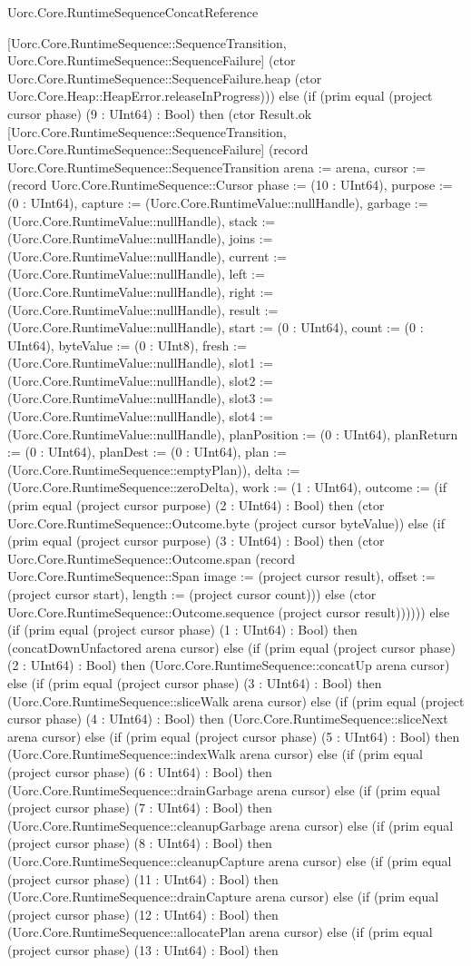 \begin{lexlean}{Uorc.Core.RuntimeSequenceConcatReference}
\begin{semanticmodule}
{[Uorc.Core.RuntimeSequence::SequenceTransition, Uorc.Core.RuntimeSequence::SequenceFailure] (ctor Uorc.Core.RuntimeSequence::SequenceFailure.heap (ctor Uorc.Core.Heap::HeapError.releaseInProgress))) else (if (prim equal (project cursor phase) (9 : UInt64) : Bool) then (ctor Result.ok [Uorc.Core.RuntimeSequence::SequenceTransition, Uorc.Core.RuntimeSequence::SequenceFailure] (record Uorc.Core.RuntimeSequence::SequenceTransition {arena := arena, cursor := (record Uorc.Core.RuntimeSequence::Cursor {phase := (10 : UInt64), purpose := (0 : UInt64), capture := (Uorc.Core.RuntimeValue::nullHandle), garbage := (Uorc.Core.RuntimeValue::nullHandle), stack := (Uorc.Core.RuntimeValue::nullHandle), joins := (Uorc.Core.RuntimeValue::nullHandle), current := (Uorc.Core.RuntimeValue::nullHandle), left := (Uorc.Core.RuntimeValue::nullHandle), right := (Uorc.Core.RuntimeValue::nullHandle), result := (Uorc.Core.RuntimeValue::nullHandle), start := (0 : UInt64), count := (0 : UInt64), byteValue := (0 : UInt8), fresh := (Uorc.Core.RuntimeValue::nullHandle), slot1 := (Uorc.Core.RuntimeValue::nullHandle), slot2 := (Uorc.Core.RuntimeValue::nullHandle), slot3 := (Uorc.Core.RuntimeValue::nullHandle), slot4 := (Uorc.Core.RuntimeValue::nullHandle), planPosition := (0 : UInt64), planReturn := (0 : UInt64), planDest := (0 : UInt64), plan := (Uorc.Core.RuntimeSequence::emptyPlan)}), delta := (Uorc.Core.RuntimeSequence::zeroDelta), work := (1 : UInt64), outcome := (if (prim equal (project cursor purpose) (2 : UInt64) : Bool) then (ctor Uorc.Core.RuntimeSequence::Outcome.byte (project cursor byteValue)) else (if (prim equal (project cursor purpose) (3 : UInt64) : Bool) then (ctor Uorc.Core.RuntimeSequence::Outcome.span (record Uorc.Core.RuntimeSequence::Span {image := (project cursor result), offset := (project cursor start), length := (project cursor count)})) else (ctor Uorc.Core.RuntimeSequence::Outcome.sequence (project cursor result))))})) else (if (prim equal (project cursor phase) (1 : UInt64) : Bool) then (concatDownUnfactored arena cursor) else (if (prim equal (project cursor phase) (2 : UInt64) : Bool) then (Uorc.Core.RuntimeSequence::concatUp arena cursor) else (if (prim equal (project cursor phase) (3 : UInt64) : Bool) then (Uorc.Core.RuntimeSequence::sliceWalk arena cursor) else (if (prim equal (project cursor phase) (4 : UInt64) : Bool) then (Uorc.Core.RuntimeSequence::sliceNext arena cursor) else (if (prim equal (project cursor phase) (5 : UInt64) : Bool) then (Uorc.Core.RuntimeSequence::indexWalk arena cursor) else (if (prim equal (project cursor phase) (6 : UInt64) : Bool) then (Uorc.Core.RuntimeSequence::drainGarbage arena cursor) else (if (prim equal (project cursor phase) (7 : UInt64) : Bool) then (Uorc.Core.RuntimeSequence::cleanupGarbage arena cursor) else (if (prim equal (project cursor phase) (8 : UInt64) : Bool) then (Uorc.Core.RuntimeSequence::cleanupCapture arena cursor) else (if (prim equal (project cursor phase) (11 : UInt64) : Bool) then (Uorc.Core.RuntimeSequence::drainCapture arena cursor) else (if (prim equal (project cursor phase) (12 : UInt64) : Bool) then (Uorc.Core.RuntimeSequence::allocatePlan arena cursor) else (if (prim equal (project cursor phase) (13 : UInt64) : Bool) then }
\end{semanticmodule}
\end{lexlean}

